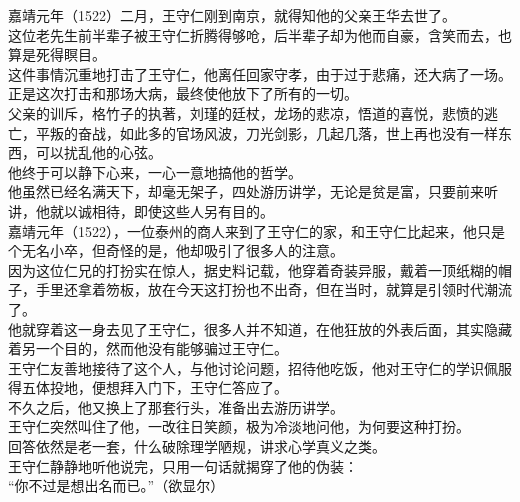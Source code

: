 \begin{multicols}{\theparacolNo}
嘉靖元年（1522）二月，王守仁刚到南京，就得知他的父亲王华去世了。\\

这位老先生前半辈子被王守仁折腾得够呛，后半辈子却为他而自豪，含笑而去，也算是死得瞑目。\\

这件事情沉重地打击了王守仁，他离任回家守孝，由于过于悲痛，还大病了一场。\\

正是这次打击和那场大病，最终使他放下了所有的一切。\\

父亲的训斥，格竹子的执著，刘瑾的廷杖，龙场的悲凉，悟道的喜悦，悲愤的逃亡，平叛的奋战，如此多的官场风波，刀光剑影，几起几落，世上再也没有一样东西，可以扰乱他的心弦。\\

他终于可以静下心来，一心一意地搞他的哲学。\\

他虽然已经名满天下，却毫无架子，四处游历讲学，无论是贫是富，只要前来听讲，他就以诚相待，即使这些人另有目的。\\

嘉靖元年（1522），一位泰州的商人来到了王守仁的家，和王守仁比起来，他只是个无名小卒，但奇怪的是，他却吸引了很多人的注意。\\

因为这位仁兄的打扮实在惊人，据史料记载，他穿着奇装异服，戴着一顶纸糊的帽子，手里还拿着笏板，放在今天这打扮也不出奇，但在当时，就算是引领时代潮流了。\\

他就穿着这一身去见了王守仁，很多人并不知道，在他狂放的外表后面，其实隐藏着另一个目的，然而他没有能够骗过王守仁。\\

王守仁友善地接待了这个人，与他讨论问题，招待他吃饭，他对王守仁的学识佩服得五体投地，便想拜入门下，王守仁答应了。\\

不久之后，他又换上了那套行头，准备出去游历讲学。\\

王守仁突然叫住了他，一改往日笑颜，极为冷淡地问他，为何要这种打扮。\\

回答依然是老一套，什么破除理学陋规，讲求心学真义之类。\\

王守仁静静地听他说完，只用一句话就揭穿了他的伪装：\\

“你不过是想出名而已。”（欲显尔）\\


\end{multicols}
